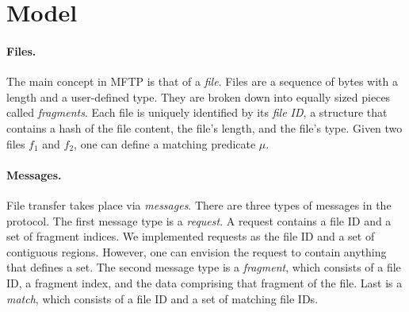 \documentclass[letterpaper]{article}
\begin{document}








\pagebreak

\section{Model\label{model}}

\paragraph {Files.}
The main concept in MFTP is that of a \emph{file}.
Files are a sequence of bytes with a length and a user-defined type.
They are broken down into equally sized pieces called \emph{fragments}.  
Each file is uniquely identified by its \emph{file ID}, a structure that contains a hash of the file content, the file's length, and the file's type.
Given two files $f_1$ and $f_2$, one can define a matching predicate $\mu$.

\paragraph{Messages.}
File transfer takes place via \emph{messages}.
There are three types of messages in the protocol.
The first message type is a \emph{request}.
A request contains a file ID and a set of fragment indices.
We implemented requests as the file ID and a set of contiguous regions.  
However, one can envision the request to contain anything that defines a set.
The second message type is a \emph{fragment}, which consists of a file ID, a fragment index, and the data comprising that fragment of the file.
Last is a \emph{match}, which consists of a file ID and a set of matching file IDs.
\end{document}
